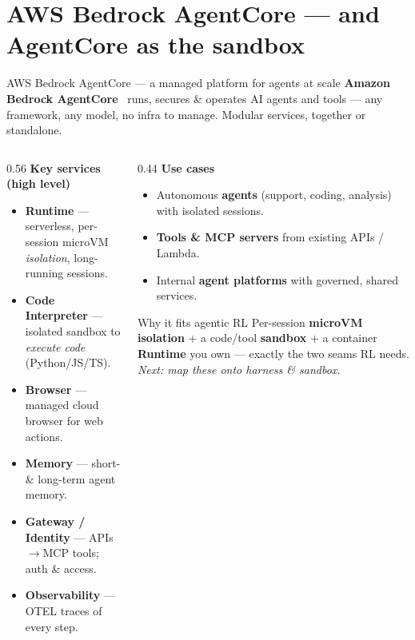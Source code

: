 \documentclass[aspectratio=169]{beamer}
\begin{document}
\section{AWS Bedrock AgentCore --- and AgentCore as the sandbox}

\begin{frame}{AWS Bedrock AgentCore --- a managed platform for agents at scale}
  \footnotesize \textbf{Amazon Bedrock AgentCore}~\cite{ac-docs} runs, secures \& operates AI agents and
  tools --- any framework, any model, no infra to manage. Modular services, together or standalone.
  \vspace{0.3em}
  \begin{columns}[T]
    \begin{column}{0.56\textwidth}
      \textbf{Key services (high level)}
      \begin{itemize}\setlength\itemsep{0.1em}
        \item \textbf{Runtime} --- serverless, per-session microVM \emph{isolation}, long-running sessions.
        \item \textbf{Code Interpreter} --- isolated sandbox to \emph{execute code} (Python/JS/TS).
        \item \textbf{Browser} --- managed cloud browser for web actions.
        \item \textbf{Memory} --- short- \& long-term agent memory.
        \item \textbf{Gateway / Identity} --- APIs$\to$MCP tools; auth \& access.
        \item \textbf{Observability} --- OTEL traces of every step.
      \end{itemize}
    \end{column}
    \begin{column}{0.44\textwidth}
      \textbf{Use cases}
      \begin{itemize}\setlength\itemsep{0.1em}
        \item Autonomous \textbf{agents} (support, coding, analysis) with isolated sessions.
        \item \textbf{Tools \& MCP servers} from existing APIs / Lambda.
        \item Internal \textbf{agent platforms} with governed, shared services.
      \end{itemize}
      \vspace{0.3em}
      \begin{block}{Why it fits agentic RL}
        \scriptsize Per-session \textbf{microVM isolation} + a code/tool \textbf{sandbox} + a container
        \textbf{Runtime} you own --- exactly the two seams RL needs. \emph{Next: map these onto harness \& sandbox.}
      \end{block}
    \end{column}
  \end{columns}
\end{frame}
\end{document}
